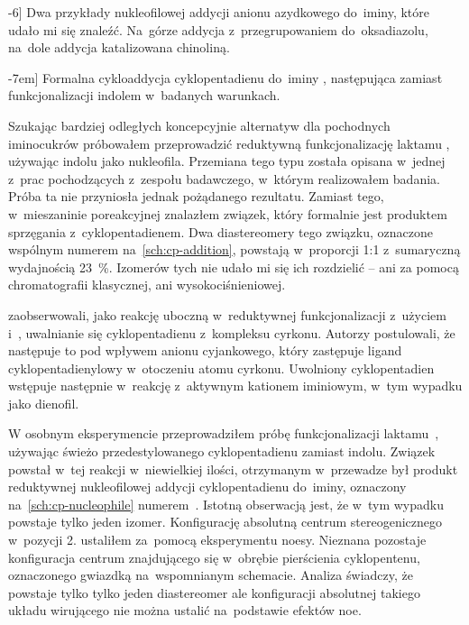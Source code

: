 \begin{scheme*}[t]
  
  \caption[][-6\baselineskip]{
    Dwa przykłady nukleofilowej addycji anionu azydkowego do~iminy, które udało mi się znaleźć.
    Na~górze addycja z~przegrupowaniem do~oksadiazolu, na~dole addycja katalizowana chinoliną.
  }
  \label{sch:azide-nucleophile}
\end{scheme*}

\begin{scheme*}[b]
  
  \caption[][-7em]{
    Formalna cykloaddycja cyklopentadienu do~iminy , następująca zamiast
      funkcjonalizacji indolem w~badanych warunkach.
  }
  \label{sch:cp-addition}
\end{scheme*}

Szukając bardziej odległych koncepcyjnie alternatyw dla  pochodnych
  iminocukrów próbowałem przeprowadzić reduktywną funkcjonalizację laktamu ,
  używając indolu jako nukleofila.
Przemiana tego typu została opisana w~jednej z~prac pochodzących z~zespołu badawczego,
  w~którym realizowałem badania.
Próba ta nie przyniosła jednak pożądanego rezultatu.
Zamiast tego, w~mieszaninie poreakcyjnej znalazłem związek, który formalnie jest produktem
  sprzęgania z~cyklopentadienem.
Dwa diastereomery tego związku, oznaczone wspólnym numerem 
  na~\cref{sch:cp-addition}, powstają w~proporcji 1:1 z~sumaryczną wydajnością \SI{23}{\percent}.
Izomerów tych nie udało mi się ich rozdzielić \--- ani za pomocą chromatografii klasycznej,
  ani wysokociśnieniowej.

\citeauthor{ulikowski16} zaobserwowali, jako reakcję uboczną w~reduktywnej
  funkcjonalizacji  z~użyciem \schwartz{} i~,
  uwalnianie się cyklopentadienu z~kompleksu cyrkonu.
Autorzy postulowali, że następuje to pod wpływem anionu cyjankowego, który zastępuje
  ligand cyklopentadienylowy w~otoczeniu atomu cyrkonu.
Uwolniony cyklopentadien wstępuje następnie w~reakcję z~aktywnym kationem
  iminiowym, w~tym wypadku jako dienofil.

W osobnym eksperymencie przeprowadziłem próbę funkcjonalizacji laktamu~,
  używając świeżo przedestylowanego cyklopentadienu zamiast indolu.
Związek~ powstał w~tej reakcji w~niewielkiej ilości, otrzymanym
  w~przewadze był produkt reduktywnej nukleofilowej addycji cyklopentadienu do~iminy,
  oznaczony na~\cref{sch:cp-nucleophile} numerem~.
Istotną obserwacją jest, że w~tym wypadku powstaje tylko jeden izomer.
Konfigurację absolutną centrum stereogenicznego w~pozycji 2. ustaliłem za~pomocą
  eksperymentu \gls{noesy}.
Nieznana pozostaje konfiguracja centrum znajdującego się w~obrębie pierścienia cyklopentenu,
  oznaczonego gwiazdką na~wspomnianym schemacie.
Analiza \NMR*{} świadczy, że powstaje tylko tylko jeden diastereomer ale konfiguracji absolutnej
  takiego układu wirującego nie można ustalić na~podstawie efektów \gls{noe}.

